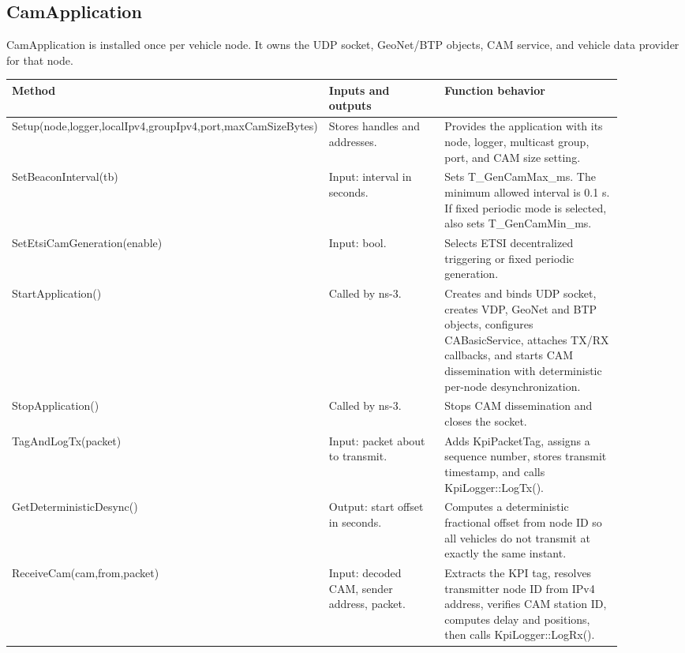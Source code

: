 \documentclass[11pt]{article}
\DeclareRobustCommand{\code}[1]{\texttt{\detokenize{#1}}}
\def\code#1{#1}%
\begin{document}
\subsection{\code{CamApplication}}

\code{CamApplication} is installed once per vehicle node.  It owns the UDP
socket, GeoNet/BTP objects, CAM service, and vehicle data provider for that node.

\begin{center}
\begin{longtable}{L{0.25\linewidth}L{0.27\linewidth}L{0.38\linewidth}}
\toprule
Method & Inputs and outputs & Function behavior \\
\midrule
\endhead
\code{Setup(node,logger,localIpv4,groupIpv4,port,maxCamSizeBytes)} &
Stores handles and addresses. &
Provides the application with its node, logger, multicast group, port, and CAM
size setting. \\
\code{SetBeaconInterval(tb)} &
Input: interval in seconds. &
Sets \code{T_GenCamMax_ms}.  The minimum allowed interval is 0.1 s.  If fixed
periodic mode is selected, also sets \code{T_GenCamMin_ms}. \\
\code{SetEtsiCamGeneration(enable)} &
Input: bool. &
Selects ETSI decentralized triggering or fixed periodic generation. \\
\code{StartApplication()} &
Called by ns-3. &
Creates and binds UDP socket, creates VDP, GeoNet and BTP objects, configures
\code{CABasicService}, attaches TX/RX callbacks, and starts CAM dissemination
with deterministic per-node desynchronization. \\
\code{StopApplication()} &
Called by ns-3. &
Stops CAM dissemination and closes the socket. \\
\code{TagAndLogTx(packet)} &
Input: packet about to transmit. &
Adds \code{KpiPacketTag}, assigns a sequence number, stores transmit timestamp,
and calls \code{KpiLogger::LogTx()}. \\
\code{GetDeterministicDesync()} &
Output: start offset in seconds. &
Computes a deterministic fractional offset from node ID so all vehicles do not
transmit at exactly the same instant. \\
\code{ReceiveCam(cam,from,packet)} &
Input: decoded CAM, sender address, packet. &
Extracts the KPI tag, resolves transmitter node ID from IPv4 address, verifies
CAM station ID, computes delay and positions, then calls \code{KpiLogger::LogRx()}. \\
\bottomrule
\end{longtable}
\end{center}
\end{document}
